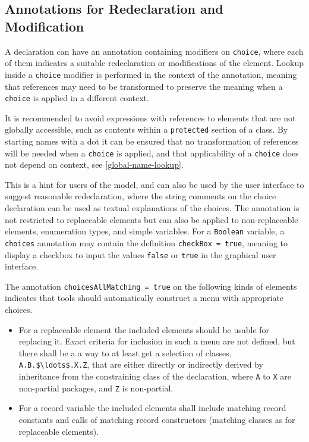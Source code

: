 \subsection{Annotations for Redeclaration and Modification}\label{annotation-choices-for-suggested-redeclarations-and-modifications}

A declaration can have an annotation  containing modifiers on \lstinline!choice!, where each of them indicates a suitable redeclaration or modifications of the element.
Lookup inside a \lstinline!choice! modifier is performed in the context of the annotation, meaning that references may need to be transformed to preserve the meaning when a \lstinline!choice! is applied in a different context.

\begin{nonnormative}
It is recommended to avoid expressions with references to elements that are not globally accessible, such as contents within a \lstinline!protected! section of a class.
By starting names with a dot it can be ensured that no transformation of references will be needed when a \lstinline!choice! is applied, and that applicability of a \lstinline!choice! does not depend on context, see \cref{global-name-lookup}.
\end{nonnormative}

This is a hint for users of the model, and can also be used by the user interface to suggest reasonable redeclaration, where the string comments on the choice declaration can be used as textual explanations of the choices.
The annotation is not restricted to replaceable elements but can also be applied to non-replaceable elements, enumeration types, and simple variables.
For a \lstinline!Boolean! variable, a \lstinline!choices! annotation may contain the definition \lstinline!checkBox = true!, meaning to display a checkbox to input the values \lstinline!false! or \lstinline!true! in the graphical user interface.

The annotation \lstinline!choicesAllMatching = true! on the following kinds of elements indicates that tools should automatically construct a menu with appropriate choices.
\begin{itemize}
\item For a replaceable element the included elements should be usable for replacing it.
Exact criteria for inclusion in such a menu are not defined, but there shall be a a way to at least get a selection of classes, \lstinline!A.B.$\ldots$.X.Z!, that are either directly or indirectly derived by inheritance from the constraining class of the declaration, where \lstinline!A! to \lstinline!X! are non-partial packages, and \lstinline!Z! is non-partial.
\item For a record variable the included elements shall include matching record constants and calls of matching record constructors (matching classes as for replaceable elements).
\end{itemize}

